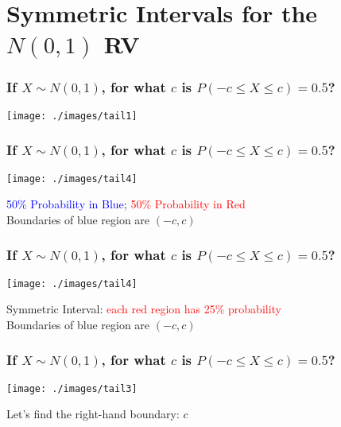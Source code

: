 \section{Symmetric Intervals for the $N(0,1)$ RV}
\begin{frame}[t]
\frametitle{If $X\sim N(0,1)$, for what $c$ is $P(-c\leq X \leq c) = 0.5$?}

\vspace{-1.5em}
\begin{center}
\texttt{[image: ./images/tail1]}
\end{center}

\vspace{-2em}
\centering

\end{frame}
\begin{frame}[t,noframenumbering]
\frametitle{If $X\sim N(0,1)$, for what $c$ is $P(-c\leq X \leq c) = 0.5$?}

\vspace{-1.5em}
\begin{center}
\texttt{[image: ./images/tail4]}
\end{center}

\vspace{-2em}
\centering
\textcolor{blue}{50\% Probability in Blue}; \textcolor{red}{50\% Probability in Red} \\
Boundaries of blue region are $(-c,c)$

\end{frame}
\begin{frame}[t,noframenumbering]
\frametitle{If $X\sim N(0,1)$, for what $c$ is $P(-c\leq X \leq c) = 0.5$?}

\vspace{-1.5em}
\begin{center}
\texttt{[image: ./images/tail4]}
\end{center}

\vspace{-2em}
\centering
Symmetric Interval: \textcolor{red}{each red region has 25\% probability}\\
Boundaries of blue region are $(-c,c)$

\end{frame}
\begin{frame}[t,noframenumbering]
\frametitle{If $X\sim N(0,1)$, for what $c$ is $P(-c\leq X \leq c) = 0.5$?}

\vspace{-1.5em}
\begin{center}
\texttt{[image: ./images/tail3]}
\end{center}

\vspace{-2em}
\centering
Let's find the right-hand boundary: $c$ 
\end{frame}

